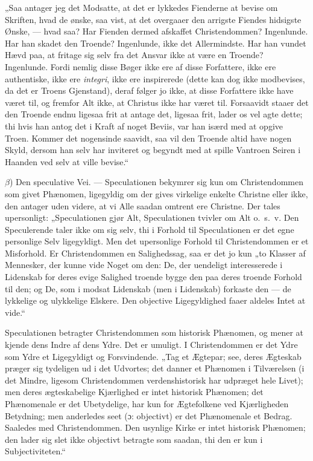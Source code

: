 „Saa antager jeg det Modsatte, at det er lykkedes Fienderne at
bevise om Skriften, hvad de ønske, saa vist, at det overgaaer den
arrigste Fiendes hidsigste Ønske, --- hvad saa? Har Fienden dermed
afskaffet Christendommen? Ingenlunde. Har han skadet den Troende?
Ingenlunde, ikke det Allermindste. Har han vundet Hævd paa, at
fritage sig selv fra det Ansvar ikke at være en Troende?
Ingenlunde. Fordi nemlig disse Bøger ikke ere af disse Forfattere,
ikke ere authentiske, ikke ere \textit{integri}, ikke ere
inspirerede (dette kan dog ikke modbevises, da det er Troens
Gjenstand), deraf følger jo ikke, at disse Forfattere ikke have
været til, og fremfor Alt ikke, at Christus ikke har været til.
Forsaavidt staaer det den Troende endnu ligesaa frit at antage
det, ligesaa frit, lader os vel agte dette; thi hvis han antog det
i Kraft af noget Beviis, var han isærd med at opgive Troen.
Kommer det nogensinde saavidt, saa vil den Troende altid have
nogen Skyld, dersom han selv har inviteret og begyndt med at
spille Vantroen Seiren i Haanden ved selv at ville bevise.“

$\beta$) Den speculative Vei. --- Speculationen bekymrer
sig kun om Christendommen som givet Phænomen,
 ligegyldig om der gives virkelige enkelte Christne eller ikke, den
antager uden videre, at vi Alle saadan omtrent ere Christne. Der
tales upersonligt: „Speculationen gjør Alt, Speculationen tvivler
om Alt o.\ s.\ v. Den Speculerende taler ikke om sig selv, thi i
Forhold til Speculationen er det egne personlige Selv
ligegyldigt. Men det upersonlige Forhold til Christendommen er et
Misforhold. Er Christendommen en Salighedssag, saa er det jo kun
„to Klasser af Mennesker, der kunne vide Noget om den: De, der
uendeligt interesserede i Lidenskab for deres evige Salighed
troende bygge den paa deres troende Forhold til den; og De, som i
modsat Lidenskab (men i Lidenskab) forkaste den --- de lykkelige
og ulykkelige Elskere. Den objective Ligegyldighed faaer aldeles
Intet at vide.“

Speculationen betragter Christendommen som historisk Phænomen, og
mener at kjende dens Indre af dens Ydre. Det er umuligt. I
Christendommen er det Ydre som Ydre et Ligegyldigt og
Forsvindende. „Tag et Ægtepar; see, deres Ægteskab præger sig
tydeligen ud i det Udvortes; det danner et Phænomen i Tilværelsen
(i det Mindre, ligesom Christendommen verdenshistorisk har
udpræget hele Livet); men deres ægteskabelige Kjærlighed er intet
historisk Phænomen; det Phænomenale er det Ubetydelige, har kun
for Ægtefolkene ved Kjærligheden Betydning; men anderledes seet
(ɔ: objectivt) er det Phænomenale et Bedrag. Saaledes med
Christendommen. Den usynlige Kirke er intet historisk Phænomen;
 den lader sig slet ikke objectivt betragte som saadan, thi den er
kun i Subjectiviteten.“

